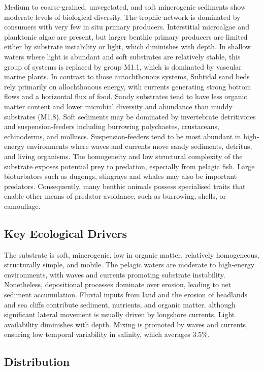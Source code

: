 \documentclass[
  letterpaper,
  DIV=11,
  numbers=noendperiod]{scrartcl}
\begin{document}
Medium to coarse-grained, unvegetated, and soft minerogenic sediments
show moderate levels of biological diversity. The trophic network is
dominated by consumers with very few in situ primary producers.
Interstitial microalgae and planktonic algae are present, but larger
benthic primary producers are limited either by substrate instability or
light, which diminishes with depth. In shallow waters where light is
abundant and soft substrates are relatively stable, this group of
systems is replaced by group M1.1, which is dominated by vascular marine
plants. In contrast to those autochthonous systems, Subtidal sand beds
rely primarily on allochthonous energy, with currents generating strong
bottom flows and a horizontal flux of food. Sandy substrates tend to
have less organic matter content and lower microbial diversity and
abundance than muddy substrates (M1.8). Soft sediments may be dominated
by invertebrate detritivores and suspension-feeders including burrowing
polychaetes, crustaceans, echinoderms, and molluscs. Suspension-feeders
tend to be most abundant in high-energy environments where waves and
currents move sandy sediments, detritus, and living organisms. The
homogeneity and low structural complexity of the substrate exposes
potential prey to predation, especially from pelagic fish. Large
bioturbators such as dugongs, stingrays and whales may also be important
predators. Consequently, many benthic animals possess specialised traits
that enable other means of predator avoidance, such as burrowing,
shells, or camouflage.

\subsection{Key Ecological Drivers}\label{key-ecological-drivers-32}

The substrate is soft, minerogenic, low in organic matter, relatively
homogeneous, structurally simple, and mobile. The pelagic waters are
moderate to high-energy environments, with waves and currents promoting
substrate instability. Nonetheless, depositional processes dominate over
erosion, leading to net sediment accumulation. Fluvial inputs from land
and the erosion of headlands and sea cliffs contribute sediment,
nutrients, and organic matter, although significant lateral movement is
usually driven by longshore currents. Light availability diminishes with
depth. Mixing is promoted by waves and currents, ensuring low temporal
variability in salinity, which averages 3.5\%.

\subsection{Distribution}\label{distribution-32}
\end{document}
